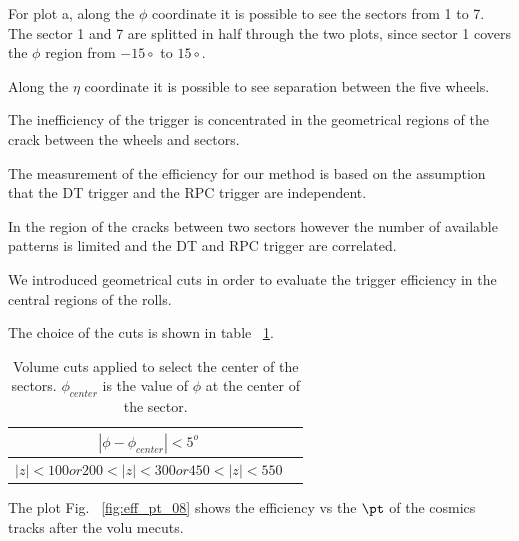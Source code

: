 

For plot a, along the $\phi$ coordinate it is possible to see the sectors from 1 to 7.
The sector 1 and 7 are splitted in half through the two plots, since sector 1 covers the $\phi$
region from $-15\circ$ to $15\circ$. 

Along the $\eta$ coordinate it is possible to see separation between the five wheels. 

The inefficiency of the trigger is concentrated in the geometrical regions of the crack 
between the wheels and sectors.


The measurement of the efficiency for our method is based on the assumption that 
the DT trigger and the RPC trigger are independent.

In the region of the cracks between two sectors however the number of 
available patterns is limited and the DT and RPC trigger are correlated.

We introduced geometrical cuts in order to evaluate the trigger efficiency 
in the central regions of the rolls. 

The choice of the cuts is shown in table ~\ref{tab:volumecuts}. 





 \begin{table}[htb]
    \label{tab:volumecuts}
    \begin{center}
      \begin{tabular}{|c|c|} \hline
  $   |\phi - \phi_{center} | < 5^o $ & \\ \hline
  $  |z| < 100 or 200 < |z| < 300 or 450 < |z| < 550$  &  \\ \hline
      \end{tabular}
      \caption{Volume cuts applied to select the center of the sectors.
       $\phi_{center}$ is the value of $\phi$ at the center of the sector. 
}
    \end{center}
  \end{table}


The plot Fig. ~\ref{fig:eff_pt_08} shows the efficiency vs the $\pt$ of the cosmics tracks after 
the volu mecuts.

